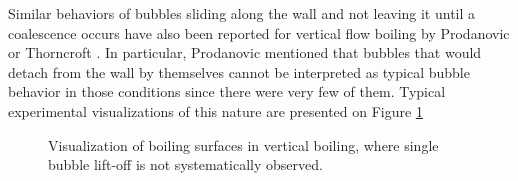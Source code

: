 Similar behaviors of bubbles sliding along the wall and not leaving it until a coalescence occurs have also been reported for vertical flow boiling by Prodanovic \etal \cite{prodanovic_bubble_2002} or Thorncroft \etal \cite{thorncroft_experimental_1998}. In particular, Prodanovic \etal mentioned that bubbles that would detach from the wall by themselves cannot be interpreted as typical bubble behavior in those conditions since there were very few of them. Typical experimental visualizations of this nature are presented on Figure \ref{fig:exp_nolift}

\begin{figure}[h!]
\begin{center}
\hspace{5pt}
\end{center}
\caption{Visualization of boiling surfaces in vertical boiling, where single bubble lift-off is not systematically observed.} 
\label{fig:exp_nolift}
\end{figure}



